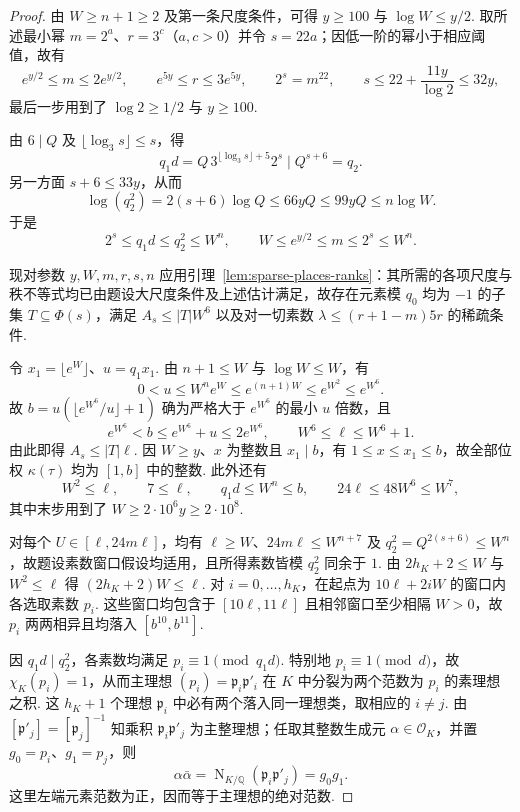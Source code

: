 \begin{proof}
由 $W\ge n+1\ge2$ 及第一条尺度条件，可得 $y\ge100$ 与 $\log W\le y/2$. 取所述最小幂 $m=2^a$、$r=3^c$（$a,c>0$）并令 $s=22a$；因低一阶的幂小于相应阈值，故有
\[
 e^{y/2}\le m\le 2e^{y/2},\qquad
 e^{5y}\le r\le3e^{5y},\qquad
 2^s=m^{22},\qquad
 s\le22+\frac{11y}{\log 2}\le32y,
\]
最后一步用到了 $\log 2\ge1/2$ 与 $y\ge100$.

由 $6\mid Q$ 及 $\lfloor\log_3 s\rfloor\le s$，得
\[
 q_1d=Q\,3^{\lfloor\log_3 s\rfloor+5}2^s\mid Q^{s+6}=q_2 .
\]
另一方面 $s+6\le33y$，从而
\[
 \log(q_2^2)=2(s+6)\log Q\le66yQ\le99yQ\le n\log W.
\]
于是
\[
 2^s\le q_1d\le q_2^2\le W^n,\qquad
 W\le e^{y/2}\le m\le2^s\le W^n.
\]

现对参数 $y,W,m,r,s,n$ 应用引理~\ref{lem:sparse-places-ranks}：其所需的各项尺度与秩不等式均已由题设大尺度条件及上述估计满足，故存在元素模 $q_0$ 均为 $-1$ 的子集 $T\subseteq\Phi(s)$，满足 $A_s\le|T|W^6$ 以及对一切素数 $\lambda\le(r+1-m)5r$ 的稀疏条件.

令 $x_1=\lfloor e^W\rfloor$、$u=q_1x_1$. 由 $n+1\le W$ 与 $\log W\le W$，有
\[
 0<u\le W^n e^W\le e^{(n+1)W}\le e^{W^2}\le e^{W^6}.
\]
故 $b=u(\lfloor e^{W^6}/u\rfloor+1)$ 确为严格大于 $e^{W^6}$ 的最小 $u$ 倍数，且
\[
 e^{W^6}<b\le e^{W^6}+u\le2e^{W^6},\qquad
 W^6\le \ell\le W^6+1 .
\]
由此即得 $A_s\le |T|\ell$. 因 $W\ge y$、$x$ 为整数且 $x_1\mid b$，有 $1\le x\le x_1\le b$，故全部位权 $\kappa(\tau)$ 均为 $[1,b]$ 中的整数. 此外还有
\[
 W^2\le \ell,\qquad 7\le \ell,\qquad q_1d\le W^n\le b,\qquad
 24\ell\le48W^6\le W^7 ,
\]
其中末步用到了 $W\ge2\cdot10^6y\ge2\cdot10^8$.

对每个 $U\in[\ell,24m\ell]$，均有 $\ell\ge W$、$24m\ell\le W^{n+7}$ 及 $q_2^2=Q^{2(s+6)}\le W^n$，故题设素数窗口假设均适用，且所得素数皆模 $q_2^2$ 同余于 $1$. 由 $2h_K+2\le W$ 与 $W^2\le \ell$ 得 $(2h_K+2)W\le \ell$. 对 $i=0,\ldots,h_K$，在起点为
$10\ell+2iW$ 的窗口内各选取素数 $p_i$. 这些窗口均包含于 $[10\ell,11\ell]$ 且相邻窗口至少相隔 $W>0$，故 $p_i$ 两两相异且均落入 $[b^{10},b^{11}]$.

因 $q_1d\mid q_2^2$，各素数均满足 $p_i\equiv1\pmod{q_1d}$. 特别地 $p_i\equiv1\pmod d$，故 $\chi_K(p_i)=1$，从而主理想
$(p_i)=\mathfrak p_i\mathfrak p'_i$ 在 $K$ 中分裂为两个范数为 $p_i$ 的素理想之积. 这 $h_K+1$ 个理想 $\mathfrak p_i$ 中必有两个落入同一理想类，取相应的 $i\ne j$. 由 $[\mathfrak p'_j]=[\mathfrak p_j]^{-1}$ 知乘积 $\mathfrak p_i\mathfrak p'_j$ 为主整理想；任取其整数生成元 $\alpha\in\mathcal O_K$，并置 $g_0=p_i$、$g_1=p_j$，则
\[
 \alpha\bar\alpha
 =\operatorname{N}_{K/\mathbb Q}(\mathfrak p_i\mathfrak p'_j)
 =g_0g_1.
\]
这里左端元素范数为正，因而等于主理想的绝对范数.


\end{proof}

